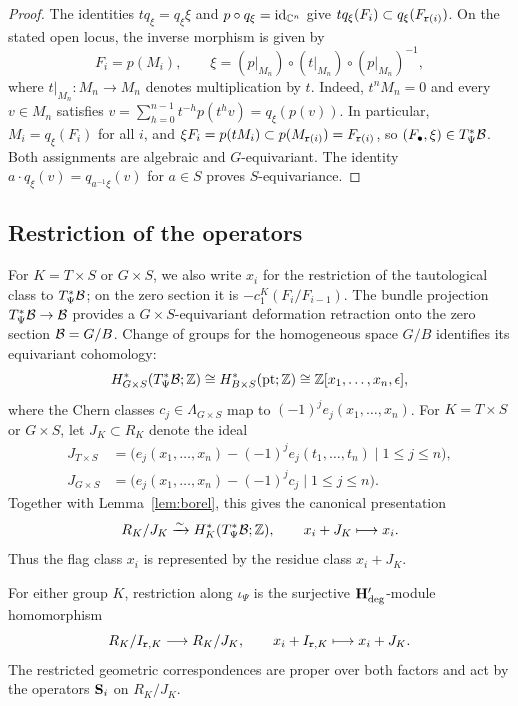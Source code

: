 \begin{proof}
The identities $tq_\xi=q_\xi\xi$ and $p\circ q_\xi=\mathrm{id}_{\mathbb C^n}$ give
$tq_\xi(F_i)\subset q_\xi(F_{\mathtt r(i)})$.
On the stated open locus, the inverse morphism is given by
\[
 F_i=p(M_i),\qquad \xi=(p|_{M_n})\circ(t|_{M_n})\circ(p|_{M_n})^{-1},
\]
where $t|_{M_n}:M_n\to M_n$ denotes multiplication by $t$.
Indeed, $t^nM_n=0$ and every $v\in M_n$ satisfies
$v=\sum_{h=0}^{n-1}t^{-h}p(t^hv)=q_\xi(p(v))$.
In particular, $M_i=q_\xi(F_i)$ for all $i$, and $\xi F_i=p(tM_i)\subset p(M_{\mathtt r(i)})=F_{\mathtt r(i)}$, so $(F_\bullet,\xi)\in T^*_\Psi\mathcal B$.
Both assignments are algebraic and $G$-equivariant.
The identity $a\cdot q_\xi(v)=q_{a^{-1}\xi}(v)$ for $a\in S$ proves $S$-equivariance.
\end{proof}


\subsection{Restriction of the operators}
\label{ss:inclusion_TX_Xdelta}

For $K=T\times S$ or $G\times S$, we also write $x_i$ for the restriction of
the tautological class to $T^*_\Psi\mathcal B$; on the zero section it is
$-c_1^K(F_i/F_{i-1})$.
The bundle projection $T^*_\Psi\mathcal B\to\mathcal B$ provides a $G\times S$-equivariant deformation retraction
onto the zero section $\mathcal B=G/B$.
Change of groups for the homogeneous space $G/B$ identifies its equivariant cohomology:
\[
 H_{G\times S}^*(T^*_\Psi\mathcal B;\mathbb Z)
 \cong H_{B\times S}^*(\mathrm{pt};\mathbb Z)
 \cong\mathbb Z[x_1,\dots,x_n,\epsilon],
\]
where the Chern classes $c_j\in\Lambda_{G\times S}$ map to $(-1)^j e_j(x_1,\dots,x_n)$.
For $K=T\times S$ or $G\times S$, let $J_K\subset R_K$ denote the ideal
\begin{align*}
 J_{T\times S}&=\bigl(e_j(x_1,\dots,x_n)-(-1)^je_j(t_1,\dots,t_n)\mid1\leq j\leq n\bigr),\\
 J_{G\times S}&=\bigl(e_j(x_1,\dots,x_n)-(-1)^jc_j\mid1\leq j\leq n\bigr).
\end{align*}
Together with Lemma~\ref{lem:borel}, this gives the canonical presentation
\[
 R_K/J_K\xrightarrow{\sim}H_K^*(T^*_\Psi\mathcal B;\mathbb Z),\qquad
 x_i+J_K\longmapsto x_i.
\]
Thus the flag class $x_i$ is represented by the residue class $x_i+J_K$.

\begin{proposition}\label{prop:inclusion_TX_Xdelta_deg_hecke}
For either group $K$, restriction along $\iota_\Psi$ is the surjective
$\mathbf H_{\mathrm{deg}}'$-module homomorphism
\[
 R_K/I_{\mathtt r,K}\longrightarrow R_K/J_K,\qquad
 x_i+I_{\mathtt r,K}\longmapsto x_i+J_K.
\]
The restricted geometric correspondences are proper over both factors
and act by the operators $\mathbf S_i$ on $R_K/J_K$.
\end{proposition}

